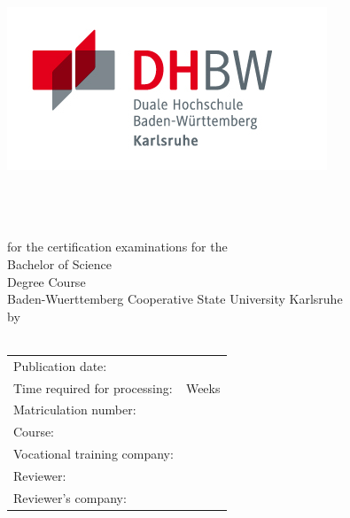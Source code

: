 \thispagestyle{plain}
\begin{titlepage}
\enlargethispage{4.0cm}
\sffamily 								%
				
\begin{flushright}
\includegraphics[scale=2.0]{Bilder/logo_dhbw.jpg}\\[5ex]
\end{flushright}

\begin{center}

\huge{\textsc{\textbf{\titel}}}\\[1.5ex]
\Large{\textbf{\untertitel}}\\[5ex]
\LARGE{\textbf{\arbeit}}\\[2ex]
\normalsize{for the certification examinations for the\\[1ex] Bachelor of Science}\\[3ex]
\Large{Degree Course \studiengang}\\[1ex]
\normalsize{Baden-Wuerttemberg Cooperative State University Karlsruhe}\\[5ex]
by\\[1ex] \autor \\[18ex]


\end{center}

\begin{flushleft}

\begin{tabular}{ll}
Publication date:				& \quad \abgabe \\
Time required for processing:	& \quad 12 Weeks   \\ 
Matriculation number: 			& \quad \matrikelnr \\ 
Course: 						& \quad \kurs \\
Vocational training company:	& \quad \firma \\ 
Reviewer:  						& \quad \betreuerdhbw \\ 
Reviewer's company: 			& \quad \betreuerfirma \\ [5ex]


\end{tabular}
\end{flushleft}
\end{titlepage}
